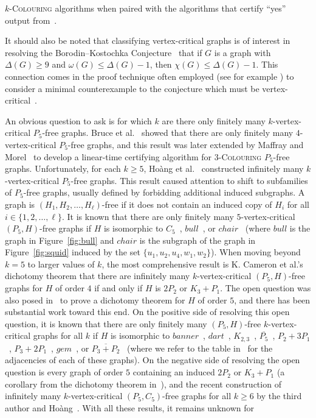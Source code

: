 \documentclass[11pt]{article}
\theoremstyle{definition}
\newcommand{\kcol}{$k$-\textsc{Colouring}}
\begin{document}
\kcol{} algorithms when paired with the algorithms that certify ``yes'' output from~\cite{Hoang2010}. 

It should also be noted that classifying vertex-critical graphs is of interest in resolving the Borodin–Kostochka Conjecture~\cite{BKconj1977} that if $G$ is a graph with $\Delta(G)\ge 9$ and $\omega(G)\le \Delta(G)-1$, then $\chi(G)\le \Delta(G)-1$. This connection comes in the proof technique often employed (see for example \cite{CranstonLafayetteRabern2022,HaxellNaserasr2023,WuWu023}) to consider a minimal counterexample to the conjecture which must be vertex-critical~\cite{GuptaPradhan2021}.

An obvious question to ask is for which $k$ are there only finitely many $k$-vertex-critical $P_5$-free graphs. Bruce et al.~\cite{Bruce2009} showed that there are only finitely many $4$-vertex-critical $P_5$-free graphs, and this result was later extended by Maffray and Morel~\cite{MaffrayMorel2012} to develop a linear-time certifying algorithm for $3$-\textsc{Colouring} $P_5$-free graphs. Unfortunately, for each $k\ge 5$, Ho\`{a}ng et al.~\cite{Hoang2015} constructed infinitely many $k$-vertex-critical $P_5$-free graphs. This result caused attention to shift to subfamilies of $P_5$-free graphs, usually defined by forbidding additional induced subgraphs. A graph is $(H_1,H_2,\dots,H_{\ell})$-free if it does not contain an induced copy of $H_i$ for all $i\in\{1,2,\dots,\ell\}$. It is known that there are only finitely many $5$-vertex-critical $(P_5,H)$-free graphs if $H$ is isomorphic to $C_5$~\cite{Hoang2015}, $bull$~\cite{HuangLiXia2023}, or $chair$~\cite{HuangLi2023} (where $bull$ is the graph in Figure~\ref{fig:bull} and $chair$ is the subgraph of the graph in Figure~\ref{fig:squid} induced by the set $\{u_1,u_2,u_4,w_1,w_2\}$). When moving beyond $k=5$ to larger values of $k$, the most comprehensive result is K. Cameron et al.'s~\cite{KCameron2021} dichotomy theorem that there are infinitely many $k$-vertex-critical $(P_5,H)$-free graphs for $H$ of order $4$ if and only if $H$ is $2P_2$ or $K_3+P_1$. The open question was also posed in~\cite{KCameron2021} to prove a dichotomy theorem for $H$ of order $5$, and there has been substantial work toward this end. On the positive side of resolving this open question, it is known that there are only finitely many $(P_5,H)$-free $k$-vertex-critical graphs for all $k$ if $H$ is isomorphic to $banner$~\cite{Brause2022}, $dart$~\cite{Xiaetal2023}, $K_{2,3}$~\cite{Kaminski2019}, $\overline{P_5}$~\cite{Dhaliwal2017}, $P_2+3P_1$~\cite{CameronHoangSawada2022}, $P_3+2P_1$~\cite{AbuadasCameronHoangSawada2022}, $gem$~\cite{CaiGoedgebeurHuang2021,CameronHoang2023}, or $\overline{P_3+P_2}$~\cite{CaiGoedgebeurHuang2021} (where we refer to the table in~\cite{CameronHoang2023P5C5} for the adjacencies of each of these graphs). On the negative side of resolving the open question is every graph of order $5$ containing an induced $2P_2$ or $K_3+P_1$ (a corollary from the dichotomy theorem in~\cite{KCameron2021}), and the recent construction of infinitely many $k$-vertex-critical $(P_5,C_5)$-free graphs for all $k\ge 6$ by the third author and Ho\`{a}ng~\cite{CameronHoang2023P5C5}. With all these results, it remains unknown for 
\end{document}
